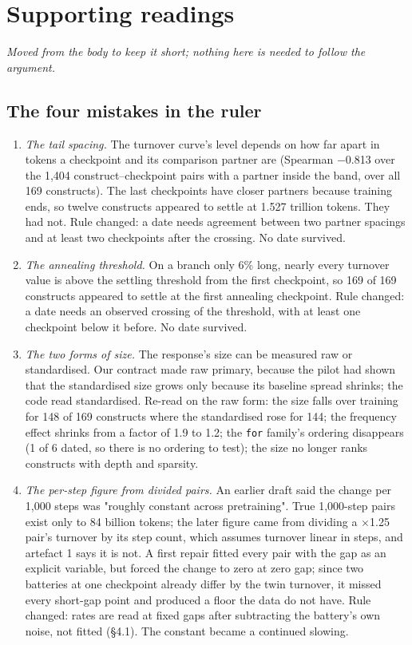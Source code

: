 \documentclass{article}
\begin{document}
\section{Supporting readings}

\emph{Moved from the body to keep it short; nothing here is needed to follow the argument.}

\subsection{The four mistakes in the ruler}

\begin{enumerate}[topsep=2pt,itemsep=1pt,parsep=0pt,partopsep=0pt,leftmargin=*]
\item \emph{The tail spacing.} The turnover curve's level depends on how far apart in tokens a checkpoint and its comparison partner are (Spearman $-$0.813 over the 1,404 construct--checkpoint pairs with a partner inside the band, over all 169 constructs). The last checkpoints have closer partners because training ends, so twelve constructs appeared to settle at 1.527 trillion tokens. They had not. Rule changed: a date needs agreement between two partner spacings and at least two checkpoints after the crossing. No date survived.
\item \emph{The annealing threshold.} On a branch only 6\% long, nearly every turnover value is above the settling threshold from the first checkpoint, so 169 of 169 constructs appeared to settle at the first annealing checkpoint. Rule changed: a date needs an observed crossing of the threshold, with at least one checkpoint below it before. No date survived.
\item \emph{The two forms of size.} The response's size can be measured raw or standardised. Our contract made raw primary, because the pilot had shown that the standardised size grows only because its baseline spread shrinks; the code read standardised. Re-read on the raw form: the size falls over training for 148 of 169 constructs where the standardised rose for 144; the frequency effect shrinks from a factor of 1.9 to 1.2; the \texttt{for} family's ordering disappears (1 of 6 dated, so there is no ordering to test); the size no longer ranks constructs with depth and sparsity.
\item \emph{The per-step figure from divided pairs.} An earlier draft said the change per 1,000 steps was "roughly constant across pretraining". True 1,000-step pairs exist only to 84 billion tokens; the later figure came from dividing a $\times$1.25 pair's turnover by its step count, which assumes turnover linear in steps, and artefact 1 says it is not. A first repair fitted every pair with the gap as an explicit variable, but forced the change to zero at zero gap; since two batteries at one checkpoint already differ by the twin turnover, it missed every short-gap point and produced a floor the data do not have. Rule changed: rates are read at fixed gaps after subtracting the battery's own noise, not fitted (\S4.1). The constant became a continued slowing.
\end{enumerate}
\end{document}
